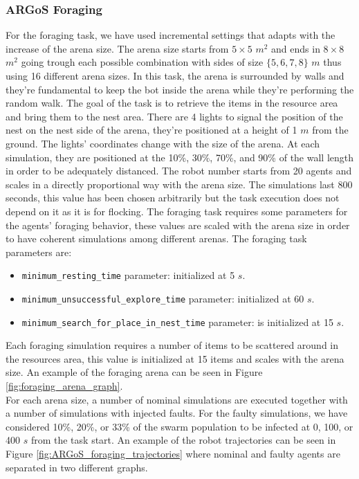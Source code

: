 \documentclass[../../Thesis.tex]{subfiles}
\begin{document}
			\subsubsection{ARGoS Foraging}
			\label{sec:argos_foraging_simulation_parameters} %
				For the foraging task, we have used incremental settings that adapts with the increase of the arena size. The arena size starts from $5\times5$ $m^2$ and ends in $8 \times 8$ $m^2$ going trough each possible combination with sides of size $\lbrace 5, 6, 7, 8 \rbrace$ $m$ thus using 16 different arena sizes. In this task, the arena is surrounded by walls and they're fundamental to keep the bot inside the arena while they're performing the random walk. The goal of the task is to retrieve the items in the resource area and bring them to the nest area. There are 4 lights to signal the position of the nest on the nest side of the arena, they're positioned at a height of 1 $m$ from the ground. The lights' coordinates change with the size of the arena. At each simulation, they are positioned at the 10\%, 30\%, 70\%, and 90\% of the wall length in order to be adequately distanced. The robot number starts from 20 agents and scales in a directly proportional way with the arena size. The simulations last 800 seconds, this value has been chosen arbitrarily but the task execution does not depend on it as it is for flocking. The foraging task requires some parameters for the agents' foraging behavior, these values are scaled with the arena size in order to have coherent simulations among different arenas. The foraging task parameters are: 
				\begin{itemize}
					\item \verb|minimum_resting_time| parameter: initialized at 5 $s$.
					\item \verb|minimum_unsuccessful_explore_time| parameter: initialized at 60 $s$.
					\item \verb|minimum_search_for_place_in_nest_time| parameter: is initialized at 15 $s$.
				\end{itemize}
				Each foraging simulation requires a number of items to be scattered around in the resources area, this value is initialized at 15 items and scales with the arena size. An example of the foraging arena can be seen in Figure \ref{fig:foraging_arena_graph}. \\
				For each arena size, a number of nominal simulations are executed together with a number of simulations with injected faults. For the faulty simulations, we have considered 10\%, 20\%, or 33\% of the swarm population to be infected at 0, 100, or 400 $s$ from the task start.  An example of the robot trajectories can be seen in Figure \ref{fig:ARGoS_foraging_trajectories} where nominal and faulty agents are separated in two different graphs.
\end{document}
